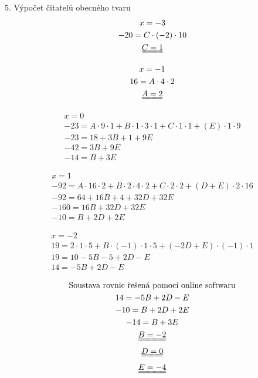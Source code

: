 \documentclass[a4paper, 11pt]{article}
\begin{document}
	\bigskip
	
	5. Výpočet čitatelů obecného tvaru
	\begin{equation}
	\begin{gathered}
	x = -3 \\
	-20 = C\cdot(-2)\cdot10 \\
	\uuline{C = 1}
	\end{gathered}
	\end{equation}
	
	\begin{equation}
	\begin{gathered}
	x = -1 \\
	16 = A\cdot4\cdot2 \\
	\uuline{A = 2}
	\end{gathered}
	\end{equation}
	
	\begin{equation}
	\begin{gathered}
	x = 0 \\
	-23 = A\cdot9\cdot1 + B\cdot1\cdot3\cdot1 + C\cdot1\cdot1 + (E)\cdot1\cdot9 \\
	-23 = 18 + 3B + 1 + 9E \\
	-42 = 3B + 9E \\
	-14 = B + 3E
	\end{gathered}
	\end{equation}
	
	\begin{equation}
	\begin{gathered}
	x = 1 \\
	-92 = A\cdot16\cdot2 + B\cdot2\cdot4\cdot2 + C\cdot2\cdot2 + (D +E)\cdot2\cdot16 \\
	-92=64+16B+4+32D+32E \\
	-160=16B+32D+32E \\
	-10=B+2D+2E
	\end{gathered}
	\end{equation}
	
	\begin{equation}
	\begin{gathered}
	x = -2 \\
	19 = 2\cdot1\cdot5 + B\cdot(-1)\cdot1\cdot5 + (-2D+E)\cdot(-1)\cdot1 \\
	19 = 10 - 5B-5 + 2D -E \\
	14 = -5B +2D -E
	\end{gathered}
	\end{equation}
	
	\begin{equation}
	\begin{gathered}
	\text{Soustava rovnic řešená pomocí online softwaru} \\
	14 = -5B +2D -E \\
	-10=B+2D+2E \\
	-14 = B + 3E \\
	\uuline{B=-2} \\
	\uuline{D=0} \\
	\uuline{E=-4}
	\end{gathered}
	\end{equation}
	
\end{document}
